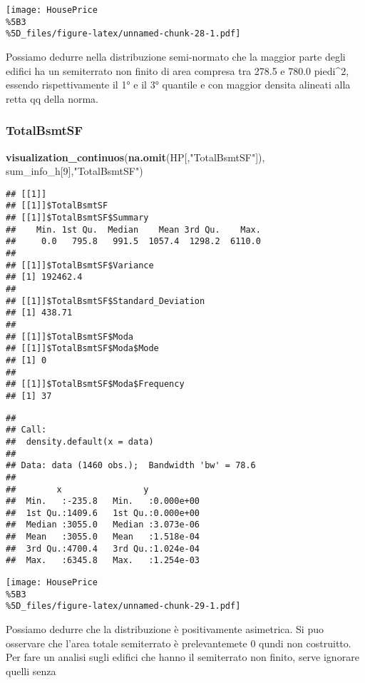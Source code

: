 \documentclass[
]{article}
\newenvironment{Shaded}{\begin{snugshade}}{\end{snugshade}}
\newcommand{\DecValTok}[1]{\textcolor[rgb]{0.00,0.00,0.81}{#1}}
\newcommand{\FunctionTok}[1]{\textcolor[rgb]{0.13,0.29,0.53}{\textbf{#1}}}
\newcommand{\NormalTok}[1]{#1}
\newcommand{\StringTok}[1]{\textcolor[rgb]{0.31,0.60,0.02}{#1}}
\begin{document}
\texttt{[image: HousePrice\\\%5B3\\\%5D\_files/figure-latex/unnamed-chunk-28-1.pdf]}

Possiamo dedurre nella distribuzione semi-normato che la maggior parte
degli edifici ha un semiterrato non finito di area compresa tra 278.5 e
780.0 piedi\^{}2, essendo rispettivamente il 1° e il 3° quantile e con
maggior densita alineati alla retta qq della norma.

\subsubsection{TotalBsmtSF}\label{totalbsmtsf}

\begin{Shaded}
\begin{Highlighting}[]
\FunctionTok{visualization\_continuos}\NormalTok{(}\FunctionTok{na.omit}\NormalTok{(HP[,}\StringTok{"TotalBsmtSF"}\NormalTok{]), sum\_info\_h[}\DecValTok{9}\NormalTok{],}\StringTok{"TotalBsmtSF"}\NormalTok{)}
\end{Highlighting}
\end{Shaded}

\begin{verbatim}
## [[1]]
## [[1]]$TotalBsmtSF
## [[1]]$TotalBsmtSF$Summary
##    Min. 1st Qu.  Median    Mean 3rd Qu.    Max. 
##     0.0   795.8   991.5  1057.4  1298.2  6110.0 
## 
## [[1]]$TotalBsmtSF$Variance
## [1] 192462.4
## 
## [[1]]$TotalBsmtSF$Standard_Deviation
## [1] 438.71
## 
## [[1]]$TotalBsmtSF$Moda
## [[1]]$TotalBsmtSF$Moda$Mode
## [1] 0
## 
## [[1]]$TotalBsmtSF$Moda$Frequency
## [1] 37
\end{verbatim}

\begin{verbatim}
## 
## Call:
##  density.default(x = data)
## 
## Data: data (1460 obs.);  Bandwidth 'bw' = 78.6
## 
##        x                y            
##  Min.   :-235.8   Min.   :0.000e+00  
##  1st Qu.:1409.6   1st Qu.:0.000e+00  
##  Median :3055.0   Median :3.073e-06  
##  Mean   :3055.0   Mean   :1.518e-04  
##  3rd Qu.:4700.4   3rd Qu.:1.024e-04  
##  Max.   :6345.8   Max.   :1.254e-03
\end{verbatim}

\texttt{[image: HousePrice\\\%5B3\\\%5D\_files/figure-latex/unnamed-chunk-29-1.pdf]}

Possiamo dedurre che la distribuzione è positivamente asimetrica. Si puo
osservare che l'area totale semiterrato è prelevantemete 0 qundi non
costruitto. Per fare un analisi sugli edifici che hanno il semiterrato
non finito, serve ignorare quelli senza
\end{document}

